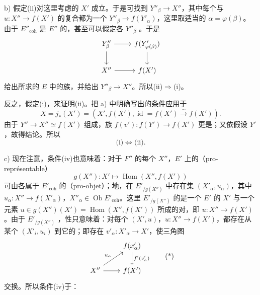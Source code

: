 b) 假定(ii)对这里考虑的 $X'$ 成立。于是可找到 $Y''_\beta\to X''$，其中每个与 $u:X''\to f(X')$ 的复合都为一个 $Y''_\beta\to f(Y'_\alpha)$，这里取适当的 $\alpha=\varphi(\beta)$。
由于 $E''_{\mathrm{coh}}$ 是 $E''$ 的，甚至可以假定各 $Y''_\beta$ 。于是
\[
\begin{tikzcd}
Y''_\beta\arrow[r]\arrow[d]&f(Y'_{\varphi(\beta)})\arrow[d]\\
X''\arrow[r]&f(X')
\end{tikzcd}
\]
给出所求的 $E$ 中的族，并给出 $Y''_\beta\to X''$。所以(ii)$\Rightarrow$(i)。

反之，假定(i)，来证明(ii)。把 a) 中明确写出的条件应用于
\[
X=j_*(X')=(X',f(X'),\operatorname{id}=f(X')\xrightarrow{\sim}f(X')).
\]
由于 $Y''\to X''\simeq f(X')$ 组成，族 $f(v'):f(Y')\to f(X')$ 更是；又依假设 $Y'$ ，故得结论。所以
\[
\text{(i)}\Longleftrightarrow\text{(ii)}.
\]

c) 现在注意，条件(iv)也意味着：对于 $F''$ 的每个 $X''$，$E'$ 上的（pro-représentable）
\[
g(X''):X'\longmapsto\operatorname{Hom}(X'',f(X'))
\]
可由各属于 $E'_{\mathrm{coh}}$ 的（pro-objet）；地，在 $E'_{/g(X'')}$ 中存在集 $(X'_\alpha,u_\alpha)$，其中 $u_\alpha:X''\to f(X'_\alpha)$，$X''_\alpha\in\operatorname{Ob}E'_{\mathrm{coh}}$。这里 $E'_{/g(X'')}$ 的是一个 $E'$ 的 $X'$ 与一个元素 $u\in g(X'')(X')=\operatorname{Hom}(X'',f(X'))$ 所成的对，即 $u:X''\to f(X')$。由于 $E'_{/g(X'')}$ ，性只意味着：对每个 $(X',u)$，$u:X''\to f(X')$，都存在从某个 $(X'_i,u_i)$ 到它的；即存在 $v'_\alpha:X'_\alpha\to X'$，使三角图
\[
\begin{tikzcd}
&f(x'_\alpha)\arrow[d,"f'(v'_\alpha)"]\\
X''\arrow[ur,"u_\alpha"]\arrow[r]&f(X')
\end{tikzcd}\tag{*}
\]
交换。所以条件(iv)于：

